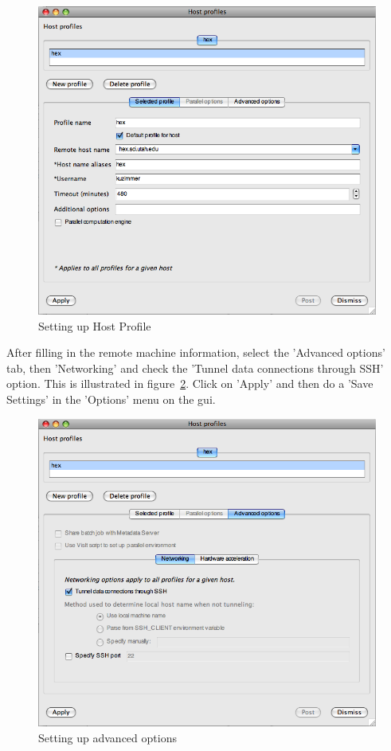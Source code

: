 \documentclass[12pt]{article}
\begin{document}
\begin{figure}
  \center
  \includegraphics[scale=0.5]{VisItHostProfile.png}
  \caption{Setting up Host Profile}
  \label{VisItHostProfile}
\end{figure}

After filling in the remote machine information, select the 'Advanced
options' tab, then 'Networking' and check the 'Tunnel data connections
through SSH' option. This is illustrated in
figure~\ref{VisItHostProfileAdv}. Click on 'Apply' and then do a 'Save
Settings' in the 'Options' menu on the gui.

\begin{figure}
  \center
  \includegraphics[scale=0.5]{VisItHostProfileAdv.png}
  \caption{Setting up advanced options}
  \label{VisItHostProfileAdv}
\end{figure}
\end{document}
